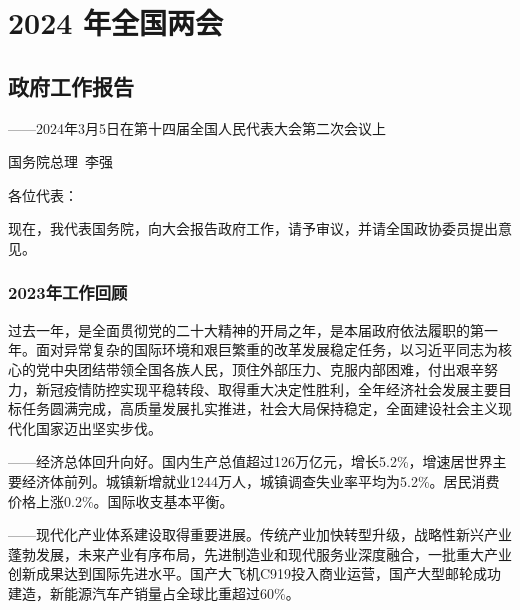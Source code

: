\documentclass[10pt, UTF8]{ctexbook} %
\begin{document}
\frontmatter
\newpage
\pagestyle{plain}
\makeatother
% 



\pagestyle{plain}
{\small\tableofcontents}
\newpage
\thispagestyle{empty}
\cleardoublepage %


\makeatletter
\let\ps@plain\ps@empty
\makeatother


\clearpage
\thispagestyle{empty}
\mainmatter

\chapter{2024 年全国两会}

\section{政府工作报告}

\begin{center}
    ——2024年3月5日在第十四届全国人民代表大会第二次会议上

    国务院总理 李强\cite{2024 政府工作报告}
\end{center}


各位代表：

现在，我代表国务院，向大会报告政府工作，请予审议，并请全国政协委员提出意见。

\subsection{2023年工作回顾}

过去一年，是全面贯彻党的二十大精神的开局之年，是本届政府依法履职的第一年。面对异常复杂的国际环境和艰巨繁重的改革发展稳定任务，以习近平同志为核心的党中央团结带领全国各族人民，顶住外部压力、克服内部困难，付出艰辛努力，新冠疫情防控实现平稳转段、取得重大决定性胜利，全年经济社会发展主要目标任务圆满完成，高质量发展扎实推进，社会大局保持稳定，全面建设社会主义现代化国家迈出坚实步伐。

——经济总体回升向好。国内生产总值超过126万亿元，增长5.2\%，增速居世界主要经济体前列。城镇新增就业1244万人，城镇调查失业率平均为5.2\%。居民消费价格上涨0.2\%。国际收支基本平衡。

——现代化产业体系建设取得重要进展。传统产业加快转型升级，战略性新兴产业蓬勃发展，未来产业有序布局，先进制造业和现代服务业深度融合，一批重大产业创新成果达到国际先进水平。国产大飞机C919投入商业运营，国产大型邮轮成功建造，新能源汽车产销量占全球比重超过60\%。
\end{document}
